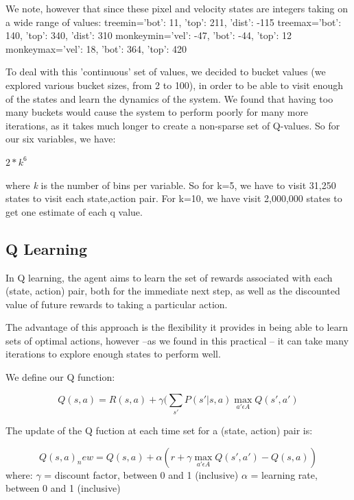 \documentclass[11pt, oneside]{article}   	%
\begin{document}
We note, however that since these pixel and velocity states are integers taking on a wide range of values:
\newline
treemin={'bot': 11, 'top': 211, 'dist': -115}
\newline
treemax={'bot': 140, 'top': 340, 'dist': 310}
\newline
monkeymin={'vel': -47, 'bot': -44, 'top': 12}
\newline
monkeymax={'vel': 18, 'bot': 364, 'top': 420}
\newline 

To deal with this 'continuous' set of values, we decided to bucket values (we explored various bucket sizes, from 2 to 100), in order to be able to visit enough of the states and learn the dynamics of the system. We found that having too many buckets would cause the system to perform poorly for many more iterations, as it takes much longer to create a non-sparse set of Q-values. So for our six variables, we have:
\begin{center}
{$2*k^{6}$} 
\end{center}
where \textit{k} is the number of bins per variable. So for k=5, we have to visit 31,250 states to visit each state,action pair. For k=10, we have visit 2,000,000 states to get one estimate of each q value.

\subsection*{Q Learning}

In Q learning, the agent aims to learn the set of rewards associated with each (state, action) pair, both for the immediate next step, as well as the discounted value of future rewards to taking a particular action.

The advantage of this approach is the flexibility it provides in being able to learn sets of optimal actions, however --as we found in this practical -- it can take many iterations to explore enough states to perform well.

We define our Q function:

\begin{equation}\label{reio}
Q(s,a) = R(s,a) +  \gamma (\sum_{s \prime} P(s\prime | s, a) \max_{a\prime \epsilon A} Q(s \prime, a \prime)
\end{equation}

The update of the Q fuction at each time set for a (state, action) pair is:

\begin{equation}\label{reio}
Q(s,a)_new = Q(s,a) +  \alpha (r + \gamma \max_{a\prime \epsilon A} Q(s \prime, a \prime) - Q(s,a))
\end{equation}
\newline
where:
\newline
$\gamma$ = discount factor, between 0 and 1 (inclusive)
\newline
$\alpha$ = learning rate, between 0 and 1 (inclusive)
\newline
\end{document}
